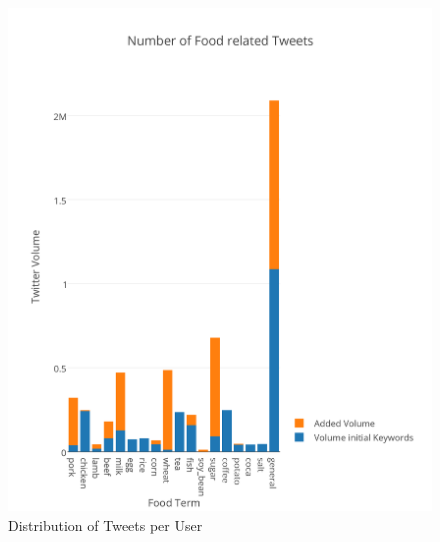 \documentclass[12pt]{report}
\begin{document}
 
 \begin{figure}[H]
\centerline{ \noindent\includegraphics[width=1\textwidth]{img/anal/exp_dist}}
 \caption{Distribution of Tweets per User}
 \label{fig:tpu}
\end{figure}
\end{document}
